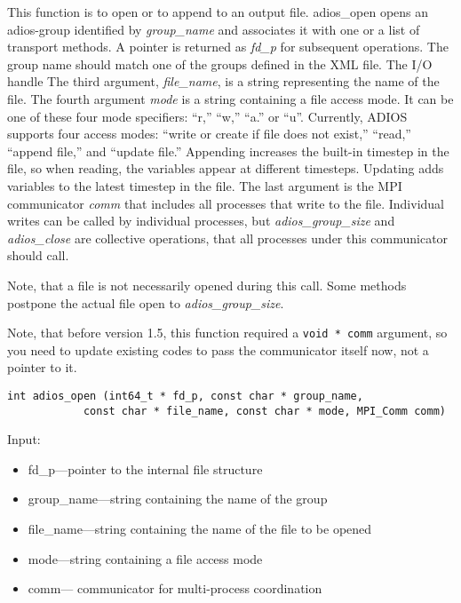 This function is to open or to append to an output file. adios\_open
opens an adios-group identified by \textit{group\_name}
and associates it with one or a list of transport methods. 
A pointer is returned as \textit{fd\_p} for subsequent operations. 
The group name should match one of the groups defined in the XML file. The I/O handle 
The third argument, \textit{file\_name}, is a string representing the name of 
the file. 
The fourth argument \textit{mode} is a string containing a file access mode. 
It can be one of these four mode specifiers: ``r,'' ``w,''  ``a.'' or ``u''. Currently, 
ADIOS supports four access modes: ``write or create if file does not exist,'' 
``read,'' ``append file,'' and ``update file.'' Appending increases the built-in timestep in the file, so when reading, the variables appear at different timesteps. Updating adds variables to the latest timestep in the file.
The last argument is the MPI communicator \textit{comm} that includes all
processes that write to the file. Individual writes can be called by individual processes, but \textit{adios\_group\_size} and \textit{adios\_close} are collective operations, that all processes under this communicator should call. 

Note, that a file is not necessarily opened during this call. Some methods postpone the actual file open to \textit{adios\_group\_size}.

Note, that before version 1.5, this function required a \verb+void * comm+ argument, so you need to update existing codes to pass the communicator itself now, not a pointer to it.

\begin{lstlisting}[alsolanguage=C]
int adios_open (int64_t * fd_p, const char * group_name,
            const char * file_name, const char * mode, MPI_Comm comm)
\end{lstlisting}

Input: 
\begin{itemize}
\item fd\_p---pointer to the internal file structure
\item group\_name---string containing the name of the group 
\item file\_name---string containing the name of the file to be opened 
\item mode---string containing  a file access mode
\item comm--- communicator for multi-process coordination
\end{itemize}

